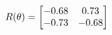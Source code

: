 \documentclass[preview]{standalone}
\begin{document}
\begin{align*}
\special{dvisvgm:raw <g id='unique000'>}R(\theta) = \begin{bmatrix}-0.68 & 0.73\\-0.73 & -0.68\end{bmatrix}\special{dvisvgm:raw </g>}
\end{align*}
\end{document}
